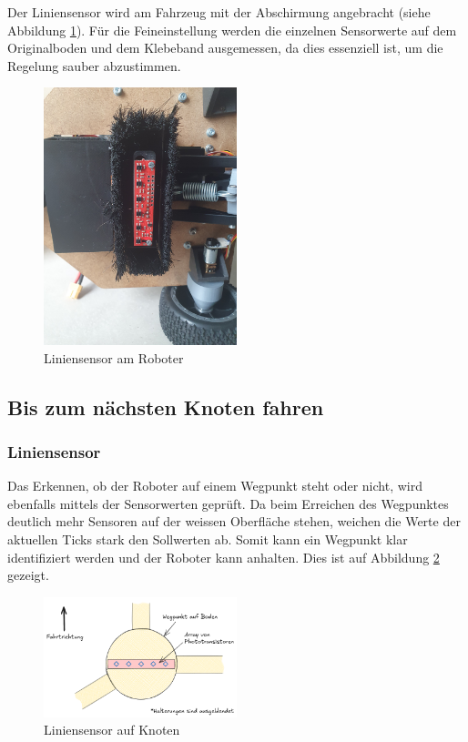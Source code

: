 Der Liniensensor wird am Fahrzeug mit der Abschirmung angebracht (siehe Abbildung \ref{fig:linsen-robi}). Für die Feineinstellung werden die einzelnen Sensorwerte auf dem Originalboden und dem Klebeband ausgemessen, da dies essenziell ist, um die Regelung sauber abzustimmen.

 \begin{figure}[H]
\centering
\includegraphics[width=0.5\textwidth ]{assets/MT/liniensensor-robi.jpg}
\caption{Liniensensor am Roboter}
\label{fig:linsen-robi}
\end{figure}


\newpage

\subsection{Bis zum nächsten Knoten fahren}

\subsubsection{Liniensensor}

Das Erkennen, ob der Roboter auf einem Wegpunkt steht oder nicht, wird ebenfalls mittels der Sensorwerten geprüft. Da beim Erreichen des Wegpunktes deutlich mehr Sensoren auf der weissen Oberfläche stehen, weichen die Werte der aktuellen Ticks stark den Sollwerten ab. Somit kann ein Wegpunkt klar identifiziert werden und der Roboter kann anhalten. Dies ist auf Abbildung \ref{fig:liniensensor_on_node} gezeigt.

\begin{figure}[H]
\centering
\includegraphics[width=0.5\textwidth ]{assets/ET/Liniensensor/linesensor_on_node.png}
\caption{Liniensensor auf Knoten}
\label{fig:liniensensor_on_node}
\end{figure}